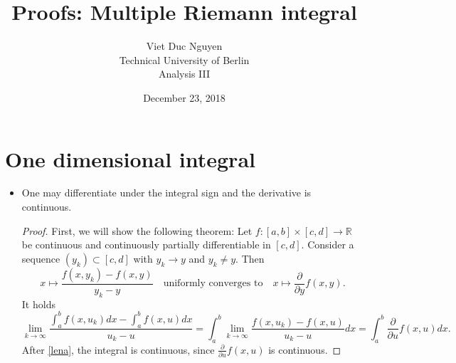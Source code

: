 \documentclass[a4paper, 11pt]{article}
\theoremstyle{plain}
\theoremstyle{definition}
\begin{document}
\title{Proofs: Multiple Riemann integral}
\author{Viet Duc Nguyen\\ Technical University of Berlin\\ Analysis III}
\date{December 23, 2018}
\maketitle
\tableofcontents

\section{One dimensional integral}
\begin{itemize}
	\item One may differentiate under the integral sign and the derivative is continuous.
	\begin{proof}
		First, we will show the following theorem: Let $f: [a,b] \times [c,d] \to \mathbb R$ be continuous and continuously partially differentiable in $[c,d]$. Consider a sequence $(y_k) \subset [c,d]$ with $y_k \to y$ and $y_k \neq y$. Then
		\[
			x \mapsto \frac{f(x,y_k) - f(x,y)}{y_k - y} \quad \text{uniformly converges to} \quad x \mapsto \frac{\partial}{\partial y}f(x,y).
		\]
		It holds
		\[
			\lim_{k \to \infty} \frac{\int^b_a f(x,u_k) dx - \int^b_a f(x,u) dx}{u_k - u} = \int^b_a \lim_{k \to \infty} \frac{f(x,u_k) - f(x,u)}{u_k -u}dx = \int^b_a \frac{\partial}{\partial u}f(x,u) dx.
		\]
		After \eqref{lena}, the integral is continuous, since $\frac{\partial}{\partial u}f(x,u)$ is continuous.
	\end{proof}
\end{itemize}
\end{document}
